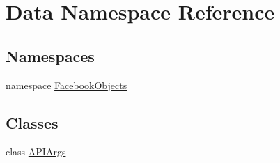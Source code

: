 \hypertarget{namespace_data}{}\section{Data Namespace Reference}
\label{namespace_data}
\subsection*{Namespaces}
\begin{DoxyCompactItemize}
\item 
namespace \hyperlink{namespace_data_1_1_facebook_objects}{Facebook\+Objects}
\end{DoxyCompactItemize}
\subsection*{Classes}
\begin{DoxyCompactItemize}
\item 
class \hyperlink{class_data_1_1_a_p_i_args}{A\+P\+I\+Args}
\end{DoxyCompactItemize}
